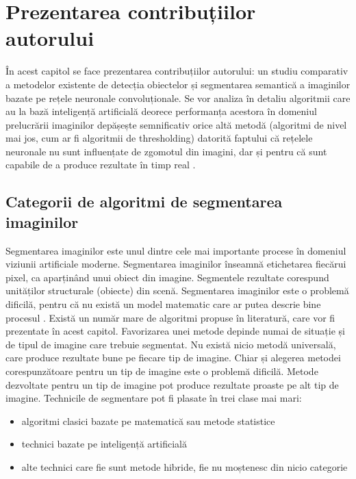 \chapter{Prezentarea contribuțiilor autorului}
\label{cap:contributii}
În acest capitol se face prezentarea contribuțiilor autorului: un studiu comparativ a metodelor existente de detecția obiectelor și segmentarea semantică a imaginilor bazate pe rețele neuronale convoluționale.\newline
Se vor analiza în detaliu algoritmii care au la bază inteligență artificială deorece performanța acestora în domeniul prelucrării imaginilor depășește semnificativ orice altă metodă (algoritmi de nivel mai jos, cum ar fi algoritmii de thresholding) datorită faptului că rețelele neuronale nu sunt influențate de zgomotul din imagini, dar și pentru că sunt capabile de a produce rezultate în timp real \cite{cat_amz}.


\section{Categorii de algoritmi de segmentarea imaginilor}
Segmentarea imaginilor este unul dintre cele mai importante procese în domeniul viziunii artificiale moderne. Segmentarea imaginilor înseamnă etichetarea fiecărui pixel, ca aparținând unui obiect din imagine. Segmentele rezultate corespund unităților structurale (obiecte) din scenă. Segmentarea imaginilor este o problemă dificilă, pentru că nu există un model matematic care ar putea descrie bine procesul \cite{cat_amz}.\newline
Există un număr mare de algoritmi propuse în literatură, care vor fi prezentate în acest capitol. Favorizarea unei metode depinde numai de situație și de tipul de imagine care trebuie segmentat. Nu există nicio metodă universală, care produce rezultate bune pe fiecare tip de imagine. Chiar și alegerea metodei corespunzătoare pentru un tip de imagine este o problemă dificilă. Metode dezvoltate pentru un tip de imagine pot produce rezultate proaste pe alt tip de imagine.\newline
Technicile de segmentare pot fi plasate în trei clase mai mari:
\begin{itemize}
	\item algoritmi clasici bazate pe matematică sau metode statistice
	\item technici bazate pe inteligență artificială
	\item alte technici care fie sunt metode hibride, fie nu moștenesc din nicio categorie
\end{itemize}

